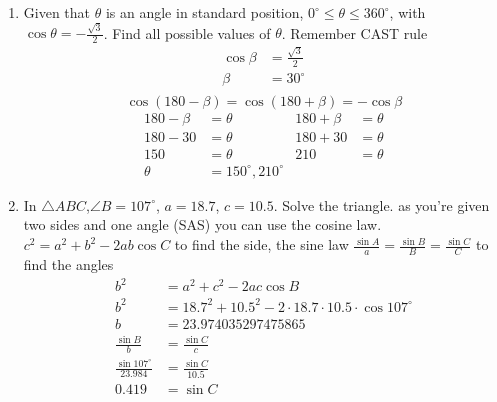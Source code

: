 \documentclass[paper=a4, fontsize=11pt]{scrartcl}
\begin{document}
\begin{enumerate}[resume]
    \item Given that $\theta$ is an angle in standard position, $0^{\circ}\le\theta\le 360^{\circ}$, with \newline $\cos\theta=-\frac{\sqrt{3}}{2}$. Find all possible values of $\theta$.
    Remember CAST rule 
    \begin{align*}
    \cos\beta&=\frac{\sqrt{3}}{2}\\
    \beta&=30^{\circ}\\
    \end{align*}
    $$\cos(180-\beta)=\cos(180+\beta)=-\cos\beta$$
    \begin{align*}
    180-\beta&=\theta&180+\beta&=\theta\\
    180-30&=\theta&180+30&=\theta\\
    150&=\theta&210&=\theta\\
    \theta&=150^{\circ},210^{\circ}
    \end{align*}
    \item In $\triangle ABC$,$\angle B=107^{\circ}$, $a=18.7$, $c=10.5$. Solve the triangle.
    as you're given two sides and one angle (SAS) you can use the cosine law. $c^2=a^2+b^2-2ab\cos C$ to find the side, the sine law $\frac{\sin A}{a}=\frac{\sin B}{B}=\frac{\sin C}{C}$ to find the angles
    \begin{align*}
        b^2&=a^2+c^2-2ac\cos B\\
        b^2&=18.7^2+10.5^2-2\cdot 18.7\cdot 10.5\cdot \cos 107^{\circ}\\
        b&=23.974035297475865\\
        \frac{\sin B}{b}&=\frac{\sin C}{c}\\
        \frac{\sin 107^{\circ}}{23.984}&=\frac{\sin C}{10.5}\\
        0.419&=\sin C\\

\end{align*}
\end{enumerate}
\end{document}
